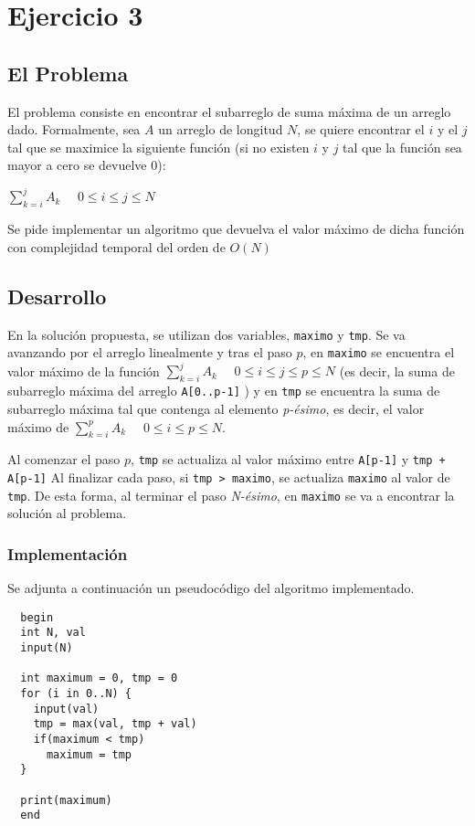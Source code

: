 \section{Ejercicio 3}
\subsection{El Problema}
El problema consiste en encontrar el subarreglo de suma máxima de un arreglo dado. Formalmente, sea $A$ un arreglo de longitud $N$, se quiere encontrar el $i$ y el $j$ tal que se maximice la siguiente función (si no existen $i$ y $j$ tal que la función sea mayor a cero se devuelve 0): 
\begin{center} $\sum_{k=i}^{j} A_k$            $ \quad 0\leq i\leq j\leq N$
\end{center}
Se pide implementar un algoritmo que devuelva el valor máximo de dicha función con complejidad temporal del orden de $O(N)$
\subsection{Desarrollo}
En la solución propuesta, se utilizan dos variables, \texttt{maximo} y \texttt{tmp}. Se va avanzando por el arreglo linealmente y tras el paso $p$, en  \texttt{maximo} se encuentra el valor máximo de la función $\sum_{k=i}^{j} A_k$            $ \quad 0\leq i\leq j\leq p \leq N$ (es decir, la suma de subarreglo máxima del arreglo  \texttt{A[0..p-1]} ) y en  \texttt{tmp} se encuentra la suma de subarreglo máxima tal que contenga al elemento \emph{p-ésimo}, es decir, el valor máximo de  $\sum_{k=i}^{p} A_k$            $ \quad 0\leq i\leq p\leq N$.


Al comenzar el paso $p$,  \texttt{tmp} se actualiza al valor máximo entre  \texttt{A[p-1]} y  \texttt{tmp + A[p-1]}
Al finalizar cada paso, si  \texttt{tmp > maximo}, se actualiza  \texttt{maximo} al valor de  \texttt{tmp}.
De esta forma, al terminar el paso \emph{N-ésimo}, en \texttt{maximo} se va a encontrar la solución al problema.
\subsubsection{Implementación}
Se adjunta a continuación un pseudocódigo del algoritmo implementado.
\begin{verbatim}
  begin
  int N, val
  input(N)

  int maximum = 0, tmp = 0
  for (i in 0..N) {
    input(val)
    tmp = max(val, tmp + val)
    if(maximum < tmp)
      maximum = tmp
  }

  print(maximum)
  end

\end{verbatim}
